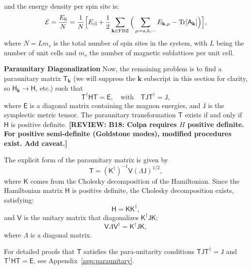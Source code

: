 \documentclass[aps, prx, nofootinbib, superscriptaddress]{revtex4-2}
\newcommand{\REVIEW}[1]{{\color{reviewcolor}\bfseries [REVIEW: #1]}}
\newcommand{\kvec}{\mathbf{k}}
\newcommand{\Tr}{\mathrm{Tr}}
\newcommand{\Theme}[1]{{\vspace{0.5cm}\noindent\textbf{#1}}}
\begin{document}
and the energy density per spin site is:
\begin{equation}
    \mathcal{E} 
    = \frac{E_{0}}{N} 
    = \frac{1}{N} \Big[ E_{\rm cl} + \frac{1}{2} \sum_{\kvec \in \mathrm{FBZ}} \Big( \sum_{\mu=a,b,\cdots} E_{\kvec, \mu} -  \Tr[\mathsf{A}_{\kvec}] \Big) \Big],
\end{equation}
where $N=Lm_{s}$ is the total number of spin sites in the system, with $L$ being the number of unit cells and $m_s$ the number of magnetic sublattices per unit cell.



\Theme{Paraunitary Diagonalization}
Now, the remaining problem is to find a paraunitary matrix $\mathsf{T}_{\kvec}$ (we will suppress the $\kvec$ subscript in this section for clarity, so $\mathsf{H}_{\kvec} \rightarrow \mathsf{H}$, etc.) such that
\begin{equation}
    \mathsf{T}^{\dagger}\mathsf{HT} = \mathsf{E}, \quad \text{with}
    \quad \mathsf{TJT}^{\dagger} = \mathsf{J},
\end{equation}
where $\mathsf{E}$ is a diagonal matrix containing the magnon energies, and $\mathsf{J}$ is the symplectic metric tensor. The paraunitary transformation $\mathsf{T}$ exists if and only if $\mathsf{H}$ is positive definite.
\REVIEW{B18: Colpa requires $H$ positive definite. For positive semi-definite (Goldstone modes), modified procedures exist. Add caveat.}

The explicit form of the paraunitary matrix is given by 
\begin{equation}
    \mathsf{T} = (\mathsf{K}^{\dagger})^{-1} \mathsf{V} \mathsf{(\Lambda J)}^{1/2},
\end{equation}
where $\mathsf{K}$ comes from the Cholesky decomposition of the Hamiltonian. Since the Hamiltonian matrix $\mathsf{H}$ is positive definite, the Cholesky decomposition exists, satisfying:
\begin{equation}
    \mathsf{H} = \mathsf{KK}^{\dagger},
\end{equation}
and $\mathsf{V}$ is the unitary matrix that diagonalizes $\mathsf{K}^{\dagger} \mathsf{JK}$:
\begin{equation}
    \mathsf{V \Lambda V}^{\dagger} = \mathsf{K}^{\dagger} \mathsf{JK},
\end{equation}
where $\mathsf{\Lambda}$ is a diagonal matrix.

\noindent For detailed proofs that $\mathsf{T}$ satisfies the para-unitarity conditions $\mathsf{TJT}^{\dagger} = \mathsf{J}$ and $\mathsf{T}^{\dagger}\mathsf{HT} = \mathsf{E}$, see Appendix~\ref{app:paraunitary}.
\end{document}
